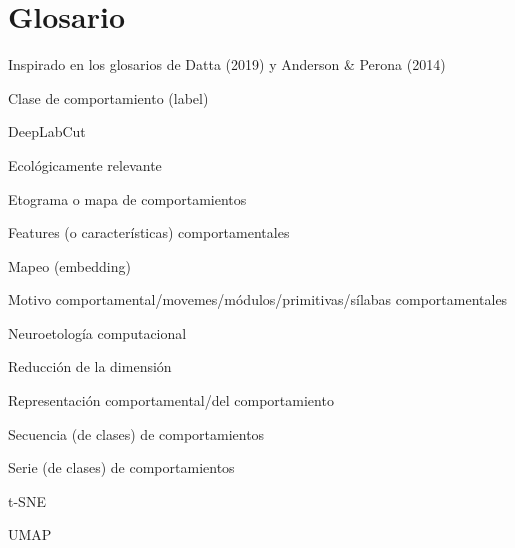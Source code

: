\chapter*{Glosario}\label{cha:glosario}
Inspirado en los glosarios de Datta (2019) y Anderson \& Perona (2014)

Clase de comportamiento (label)

DeepLabCut

Ecológicamente relevante

Etograma o mapa de comportamientos

Features (o características) comportamentales

Mapeo (embedding)

Motivo comportamental/movemes/módulos/primitivas/sílabas comportamentales

Neuroetología computacional

Reducción de la dimensión

Representación comportamental/del comportamiento

Secuencia (de clases) de comportamientos

Serie (de clases) de comportamientos

t-SNE

UMAP





